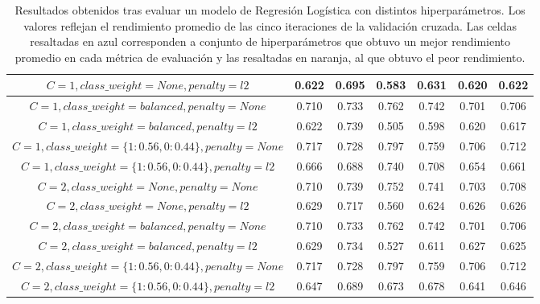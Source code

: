 \begin{table}[h!]
\begin{adjustbox}{max width=\textwidth}
\begin{tabular}{ *{7}{|c}| }
    \hline
    $C=1, class\_weight=None, penalty=l2$ & 0.622 & 0.695 & 0.583 & 0.631 & 0.620 & 0.622 \\
    \hline
    $C=1, class\_weight=balanced, penalty=None$ & 0.710 & 0.733 & 0.762 & 0.742 & 0.701 & 0.706 \\
    \hline
    $C=1, class\_weight=balanced, penalty=l2$ & 0.622 & 0.739 & 0.505 & 0.598 & 0.620 & 0.617 \\
    \hline
    $C=1, class\_weight=\lbrace1: 0.56, 0: 0.44\rbrace, penalty=None$ & 0.717 & 0.728 & 0.797 & 0.759 & 0.706 & 0.712 \\
    \hline
    $C=1, class\_weight=\lbrace1: 0.56, 0: 0.44\rbrace, penalty=l2$ & 0.666 & 0.688 & 0.740 & 0.708 & 0.654 & 0.661 \\
    \hline
    $C=2, class\_weight=None, penalty=None$ & 0.710 & 0.739 & 0.752 & 0.741 & 0.703 & 0.708 \\
    \hline
    $C=2, class\_weight=None, penalty=l2$ & 0.629 & 0.717 & 0.560 & 0.624 & 0.626 & 0.626 \\
    \hline
    $C=2, class\_weight=balanced, penalty=None$ & 0.710 & 0.733 & 0.762 & 0.742 & 0.701 & 0.706 \\
    \hline
    $C=2, class\_weight=balanced, penalty=l2$ & 0.629 & 0.734 & 0.527 & 0.611 & 0.627 & 0.625 \\
    \hline
    $C=2, class\_weight=\lbrace1: 0.56, 0: 0.44\rbrace, penalty=None$ & 0.717 & 0.728 & 0.797 & 0.759 & 0.706 & 0.712 \\
    \hline
    $C=2, class\_weight=\lbrace1: 0.56, 0: 0.44\rbrace, penalty=l2$ & 0.647 & 0.689 & 0.673 & 0.678 & 0.641 & 0.646 \\
    \hline
\end{tabular}
\end{adjustbox}
\caption{Resultados obtenidos tras evaluar un modelo de Regresi\'on Log\'istica con
distintos hiperpar\'ametros. Los valores reflejan el rendimiento promedio de las
cinco iteraciones de la validaci\'on cruzada. Las celdas resaltadas en azul
corresponden a conjunto de hiperpar\'ametros que obtuvo un mejor rendimiento
promedio en cada m\'etrica de evaluaci\'on y las resaltadas en naranja, al
que obtuvo el peor rendimiento.}
\label{table-results-models-params}
\end{table}

